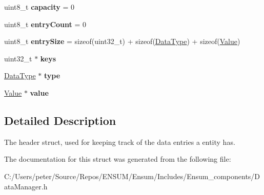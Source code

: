 \begin{DoxyCompactItemize}
\item 
uint8\+\_\+t {\bfseries capacity} = 0\hypertarget{struct_ensum_1_1_components_1_1_data_manager_1_1_entry_header_a654a83e048907493d3547112ce0caf6a}{}\label{struct_ensum_1_1_components_1_1_data_manager_1_1_entry_header_a654a83e048907493d3547112ce0caf6a}

\item 
uint8\+\_\+t {\bfseries entry\+Count} = 0\hypertarget{struct_ensum_1_1_components_1_1_data_manager_1_1_entry_header_aad8d696cdacd86dd94f72f8ddd906090}{}\label{struct_ensum_1_1_components_1_1_data_manager_1_1_entry_header_aad8d696cdacd86dd94f72f8ddd906090}

\item 
uint8\+\_\+t {\bfseries entry\+Size} = sizeof(uint32\+\_\+t) + sizeof(\hyperlink{class_ensum_1_1_components_1_1_data_manager_aad73f648c4aee3f0530463eb787a7d7c}{Data\+Type}) + sizeof(\hyperlink{struct_ensum_1_1_components_1_1_data_manager_1_1_value}{Value})\hypertarget{struct_ensum_1_1_components_1_1_data_manager_1_1_entry_header_ad853eb6deff5a8991708b4de7e002e3e}{}\label{struct_ensum_1_1_components_1_1_data_manager_1_1_entry_header_ad853eb6deff5a8991708b4de7e002e3e}

\item 
uint32\+\_\+t $\ast$ {\bfseries keys}\hypertarget{struct_ensum_1_1_components_1_1_data_manager_1_1_entry_header_a925affe1ceff27a218fc851a73c5a0dc}{}\label{struct_ensum_1_1_components_1_1_data_manager_1_1_entry_header_a925affe1ceff27a218fc851a73c5a0dc}

\item 
\hyperlink{class_ensum_1_1_components_1_1_data_manager_aad73f648c4aee3f0530463eb787a7d7c}{Data\+Type} $\ast$ {\bfseries type}\hypertarget{struct_ensum_1_1_components_1_1_data_manager_1_1_entry_header_ae0b45453ca2df2abc12c0600448a4de5}{}\label{struct_ensum_1_1_components_1_1_data_manager_1_1_entry_header_ae0b45453ca2df2abc12c0600448a4de5}

\item 
\hyperlink{struct_ensum_1_1_components_1_1_data_manager_1_1_value}{Value} $\ast$ {\bfseries value}\hypertarget{struct_ensum_1_1_components_1_1_data_manager_1_1_entry_header_a92f14dfc77b6ca30285d37fa95d1fb5d}{}\label{struct_ensum_1_1_components_1_1_data_manager_1_1_entry_header_a92f14dfc77b6ca30285d37fa95d1fb5d}

\end{DoxyCompactItemize}


\subsection{Detailed Description}
The header struct, used for keeping track of the data entries a entity has. 

The documentation for this struct was generated from the following file\+:\begin{DoxyCompactItemize}
\item 
C\+:/\+Users/peter/\+Source/\+Repos/\+E\+N\+S\+U\+M/\+Ensum/\+Includes/\+Ensum\+\_\+components/Data\+Manager.\+h\end{DoxyCompactItemize}
